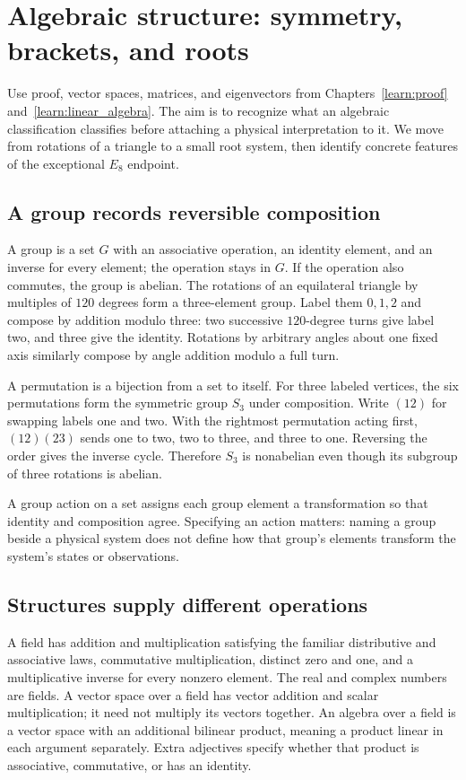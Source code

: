 \chapter{Algebraic structure: symmetry, brackets, and roots}
\label{learn:algebra}



Use proof, vector spaces, matrices, and eigenvectors from
Chapters~\ref{learn:proof} and~\ref{learn:linear_algebra}. The aim is to
recognize what an algebraic classification classifies before attaching a
physical interpretation to it. We move from rotations of a triangle to a
small root system, then identify concrete features of the exceptional
$E_8$ endpoint.



\section{A group records reversible composition}
A group is a set $G$ with an associative operation, an identity element,
and an inverse for every element; the operation stays in $G$. If the
operation also commutes, the group is abelian. The rotations of an
equilateral triangle by multiples of $120$ degrees form a three-element
group. Label them $0,1,2$ and compose by addition modulo three: two
successive $120$-degree turns give label two, and three give the identity.
Rotations by arbitrary angles about one fixed axis similarly compose by
angle addition modulo a full turn.

A permutation is a bijection from a set to itself. For three labeled
vertices, the six permutations form the symmetric group $S_3$ under
composition. Write $(12)$ for swapping labels one and two. With the rightmost
permutation acting first, $(12)(23)$ sends one to two, two to three, and
three to one. Reversing the order gives the inverse cycle. Therefore $S_3$
is nonabelian even though its subgroup of three rotations is abelian.

A group action on a set assigns each group element a transformation so that
identity and composition agree. Specifying an action matters: naming a group
beside a physical system does not define how that group's elements transform
the system's states or observations.

\section{Structures supply different operations}
A field has addition and multiplication satisfying the familiar distributive
and associative laws, commutative multiplication, distinct zero and one, and
a multiplicative inverse for every nonzero element. The real and complex
numbers are fields. A vector space over a field has vector addition and
scalar multiplication; it need not multiply its vectors together. An algebra
over a field is a vector space with an additional bilinear product, meaning
a product linear in each argument separately. Extra adjectives specify
whether that product is associative, commutative, or has an identity.

